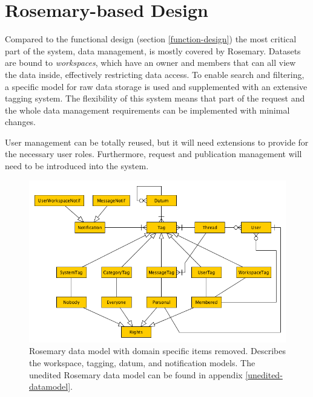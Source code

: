 \section{Rosemary-based Design}
\label{reuse-rosemary}


Compared to the functional design (section \ref{function-design}) the most critical part of the system, data management, is mostly covered by Rosemary.
Datasets are bound to \emph{workspaces}, which have an owner and members that can all view the data inside, effectively restricting data access.
To enable  search and filtering, a specific model for raw data storage is used and supplemented with an extensive tagging system.
The flexibility of this system means that part of the request and the whole data management requirements can be implemented with minimal changes.

User management can be totally reused, but it will need extensions to provide for the necessary user roles.
Furthermore, request and publication management will need to be introduced into the system.

\begin{figure}[!hb]
	\centering
	\includegraphics[width=1.0\linewidth]{images/datamodel-clean}
	\caption{
		Rosemary data model with domain specific items removed.
		Describes the workspace, tagging, datum, and notification models.
		The unedited Rosemary data model can be found in appendix \ref{unedited-datamodel}.
	}
	\label{fig:reuse-rosemary-dm}
\end{figure}

